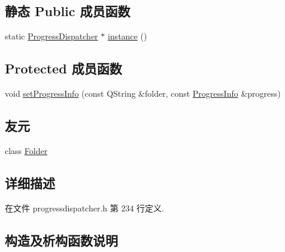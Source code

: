 \subsection*{静态 Public 成员函数}
\begin{DoxyCompactItemize}
\item 
static \hyperlink{class_o_c_c_1_1_progress_dispatcher}{Progress\+Dispatcher} $\ast$ \hyperlink{class_o_c_c_1_1_progress_dispatcher_a6dd53f3687102876817946fe6c545cd7}{instance} ()
\end{DoxyCompactItemize}
\subsection*{Protected 成员函数}
\begin{DoxyCompactItemize}
\item 
void \hyperlink{class_o_c_c_1_1_progress_dispatcher_a1e9186b2859781affd95561a9a09e2fa}{set\+Progress\+Info} (const Q\+String \&folder, const \hyperlink{class_o_c_c_1_1_progress_info}{Progress\+Info} \&progress)
\end{DoxyCompactItemize}
\subsection*{友元}
\begin{DoxyCompactItemize}
\item 
class \hyperlink{class_o_c_c_1_1_progress_dispatcher_a636accac57b57b9e90b136a583297044}{Folder}
\end{DoxyCompactItemize}


\subsection{详细描述}


在文件 progressdispatcher.\+h 第 234 行定义.



\subsection{构造及析构函数说明}
\mbox{\label{class_o_c_c_1_1_progress_dispatcher_a6c35947d6acd2f6a5d1c1f46a187c454}} 
